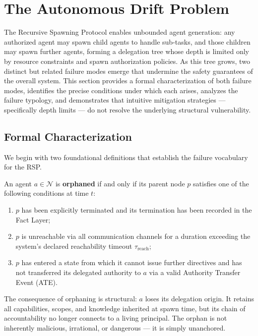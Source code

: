 \section{The Autonomous Drift Problem}
\label{sec:autonomous-drift}

The Recursive Spawning Protocol enables unbounded agent generation: any authorized agent may spawn child agents to handle sub-tasks, and those children may spawn further agents, forming a delegation tree whose depth is limited only by resource constraints and spawn authorization policies. As this tree grows, two distinct but related failure modes emerge that undermine the safety guarantees of the overall system. This section provides a formal characterization of both failure modes, identifies the precise conditions under which each arises, analyzes the failure typology, and demonstrates that intuitive mitigation strategies — specifically depth limits — do not resolve the underlying structural vulnerability.

\subsection{Formal Characterization}
\label{sec:drift-characterization}

We begin with two foundational definitions that establish the failure vocabulary for the RSP.

\begin{definition}
\label{def:orphaned-agent}
An agent $a \in \mathcal{N}$ is \textbf{orphaned} if and only if its parent node $p$ satisfies one of the following conditions at time $t$:

\begin{enumerate}
    \item[(O1)] $p$ has been explicitly terminated and its termination has been recorded in the Fact Layer;
    \item[(O2)] $p$ is unreachable via all communication channels for a duration exceeding the system's declared reachability timeout $\tau_{\text{reach}}$;
    \item[(O3)] $p$ has entered a state from which it cannot issue further directives and has not transferred its delegated authority to $a$ via a valid Authority Transfer Event (ATE).
\end{enumerate}

The consequence of orphaning is structural: $a$ loses its delegation origin. It retains all capabilities, scopes, and knowledge inherited at spawn time, but its chain of accountability no longer connects to a living principal. The orphan is not inherently malicious, irrational, or dangerous — it is simply unanchored.

\end{definition}

